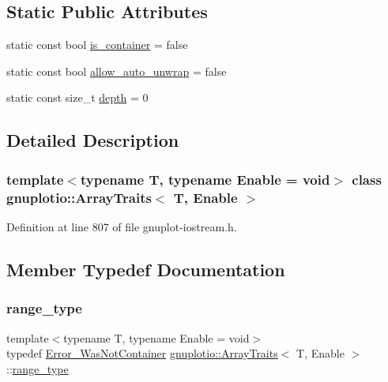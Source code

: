 \subsection*{Static Public Attributes}
\begin{DoxyCompactItemize}
\item 
static const bool \hyperlink{classgnuplotio_1_1_array_traits_ac5d19b25086565613c305960bd9d4a78}{is\+\_\+container} = false
\item 
static const bool \hyperlink{classgnuplotio_1_1_array_traits_a354d64663551a34c36c5fa7823859668}{allow\+\_\+auto\+\_\+unwrap} = false
\item 
static const size\+\_\+t \hyperlink{classgnuplotio_1_1_array_traits_a6fbd8c815e595f4efbcafd9b0eeb06f2}{depth} = 0
\end{DoxyCompactItemize}


\subsection{Detailed Description}
\subsubsection*{template$<$typename T, typename Enable = void$>$\newline
class gnuplotio\+::\+Array\+Traits$<$ T, Enable $>$}



Definition at line 807 of file gnuplot-\/iostream.\+h.



\subsection{Member Typedef Documentation}
\mbox{\label{classgnuplotio_1_1_array_traits_ae53464a5175c03deec403392b8dcb3c5}} 
\subsubsection{\texorpdfstring{range\+\_\+type}{range\_type}}
{\footnotesize\ttfamily template$<$typename T, typename Enable = void$>$ \\
typedef \hyperlink{structgnuplotio_1_1_error___was_not_container}{Error\+\_\+\+Was\+Not\+Container} \hyperlink{classgnuplotio_1_1_array_traits}{gnuplotio\+::\+Array\+Traits}$<$ T, Enable $>$\+::\hyperlink{classgnuplotio_1_1_array_traits_ae53464a5175c03deec403392b8dcb3c5}{range\+\_\+type}}



